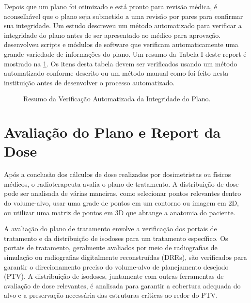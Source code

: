 \documentclass[11pt,a4paper]{article}
\begin{document}
	Depois que um plano foi otimizado e está pronto para revisão médica, é aconselhável que o plano seja submetido a uma revisão por pares para confirmar sua integridade. Um estudo descreveu um método automatizado para verificar a integridade do plano antes de ser apresentado ao médico para aprovação. \citet{yang2012automated} desenvolveu scripts e módulos de software que verificam automaticamente uma grande variedade de informações do plano. Um resumo da Tabela I deste report é mostrado na \ref{fig:checkPlanoAutomatizado}. Os itens desta tabela devem ser verificados usando um método automatizado conforme descrito ou um método manual como foi feito nesta instituição antes de desenvolver o processo automatizado.

	\begin{figure}[h]
		\centering
		\caption{Resumo da Verificação Automatizada da Integridade do Plano.}
		\label{fig:checkPlanoAutomatizado}
	\end{figure}

\section{Avaliação do Plano e Report da Dose}

	Após a conclusão dos cálculos de dose realizados por dosimetristas ou físicos médicos, o radioterapeuta avalia o plano de tratamento. A distribuição de dose pode ser analisada de várias maneiras, como selecionar pontos relevantes dentro do volume-alvo, usar uma grade de pontos em um contorno ou imagem em 2D, ou utilizar uma matriz de pontos em 3D que abrange a anatomia do paciente.

	A avaliação do plano de tratamento envolve a verificação dos portais de tratamento e da distribuição de isodoses para um tratamento específico. Os portais de tratamento, geralmente avaliados por meio de radiografias de simulação ou radiografias digitalmente reconstruídas (DRRs), são verificados para garantir o direcionamento preciso do volume-alvo de planejamento desejado (PTV). A distribuição de isodoses, juntamente com outras ferramentas de avaliação de dose relevantes, é analisada para garantir a cobertura adequada do alvo e a preservação necessária das estruturas críticas ao redor do PTV.
\end{document}
